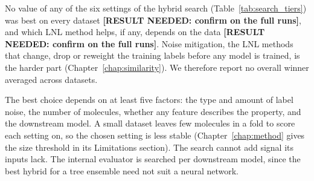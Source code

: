 
No value of any of the six settings of the hybrid search (Table~\ref{tab:search_tiers}) was best on every dataset \textbf{[RESULT NEEDED: confirm on the full runs]}, and which LNL method helps, if any, depends on the data \textbf{[RESULT NEEDED: confirm on the full runs]}. Noise mitigation, the LNL methods that change, drop or reweight the training labels before any model is trained, is the harder part (Chapter~\ref{chap:similarity}). We therefore report no overall winner averaged across datasets.

The best choice depends on at least five factors: the type and amount of label noise, the number of molecules, whether any feature describes the property, and the downstream model. A small dataset leaves few molecules in a fold to score each setting on, so the chosen setting is less stable (Chapter~\ref{chap:method} gives the size threshold in its Limitations section). The search cannot add signal its inputs lack. The internal evaluator is searched per downstream model, since the best hybrid for a tree ensemble need not suit a neural network.


